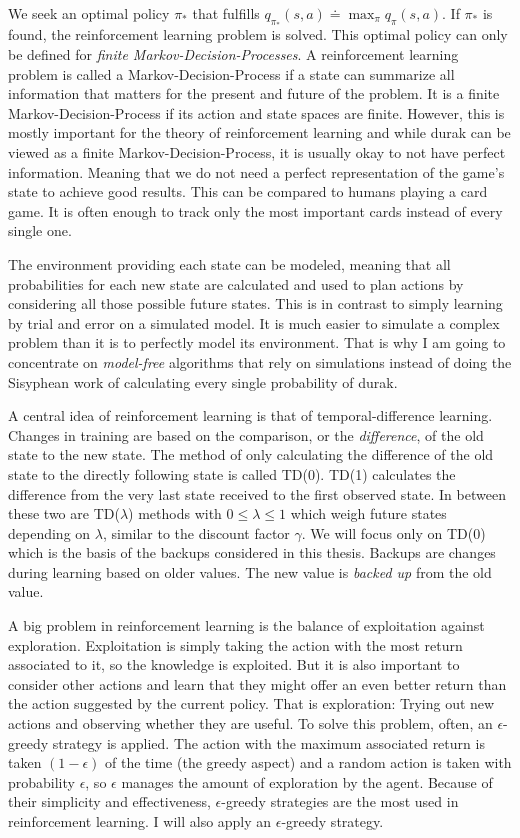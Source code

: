 \documentclass[a4paper,titlepage]{article}
\begin{document}
We seek an optimal policy $\pi_*$ that fulfills $q_{\pi_*}(s, a) \doteq \max_\pi q_\pi(s, a)$. If $\pi_*$ is found, the reinforcement learning problem is solved. This optimal policy can only be defined for \emph{finite Markov-Decision-Processes}. A reinforcement learning problem is called a Markov-Decision-Process if a state can summarize all information that matters for the present and future of the problem. It is a finite Markov-Decision-Process if its action and state spaces are finite. However, this is mostly important for the theory of reinforcement learning and while durak can be viewed as a finite Markov-Decision-Process, it is usually okay to not have perfect information. Meaning that we do not need a perfect representation of the game's state to achieve good results. This can be compared to humans playing a card game. It is often enough to track only the most important cards instead of every single one.

The environment providing each state can be modeled, meaning that all probabilities for each new state are calculated and used to plan actions by considering all those possible future states. This is in contrast to simply learning by trial and error on a simulated model. It is much easier to simulate a complex problem than it is to perfectly model its environment. That is why I am going to concentrate on \emph{model-free} algorithms that rely on simulations instead of doing the Sisyphean work of calculating every single probability of durak.

A central idea of reinforcement learning is that of temporal-difference learning. Changes in training are based on the comparison, or the \emph{difference}, of the old state to the new state. The method of only calculating the difference of the old state to the directly following state is called TD(0). TD(1) calculates the difference from the very last state received to the first observed state. In between these two are TD($\lambda$) methods with $0 \leq \lambda \leq 1$ which weigh future states depending on $\lambda$, similar to the discount factor $\gamma$. We will focus only on TD(0) which is the basis of the backups considered in this thesis. Backups are changes during learning based on older values. The new value is \emph{backed up} from the old value.

A big problem in reinforcement learning is the balance of exploitation against exploration. Exploitation is simply taking the action with the most return associated to it, so the knowledge is exploited. But it is also important to consider other actions and learn that they might offer an even better return than the action suggested by the current policy. That is exploration: Trying out new actions and observing whether they are useful. To solve this problem, often, an $\epsilon$-greedy strategy is applied. The action with the maximum associated return is taken $(1 - \epsilon)$ of the time (the greedy aspect) and a random action is taken with probability $\epsilon$, so $\epsilon$ manages the amount of exploration by the agent. Because of their simplicity and effectiveness, $\epsilon$-greedy strategies are the most used in reinforcement learning. I will also apply an $\epsilon$-greedy strategy.
\end{document}
